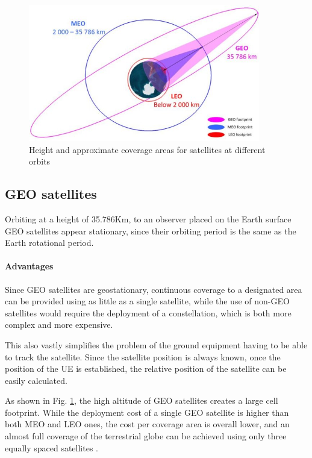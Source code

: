 \begin{figure}[ht]
    \centering
    \includegraphics[width=0.9\textwidth]{res/satellite-coverages.jpg}
    \caption{Height and approximate coverage areas for satellites at different orbits \cite{sustainable-sat-com-6g}}
    \label{fig:satellite_coverages}
\end{figure}

\subsection{GEO satellites}
Orbiting at a height of 35.786Km, to an observer placed on the Earth surface \ac{GEO} satellites appear stationary, since their orbiting period is the same as the Earth rotational period.

\paragraph{Advantages}    
Since \ac{GEO} satellites are geostationary, continuous coverage to a designated area can be provided using as little as a single satellite, while the use of non-\ac{GEO} satellites would require the deployment of a constellation, which is both more complex and more expensive. 

This also vastly simplifies the problem of the ground equipment having to be able to track the satellite. Since the satellite position is always known, once the position of the \ac{UE} is established, the relative position of the satellite can be easily calculated.

As shown in Fig. \ref{fig:satellite_coverages}, the high altitude of \ac{GEO} satellites creates a large cell footprint. While the deployment cost of a single \ac{GEO} satellite is higher than both \ac{MEO} and \ac{LEO} ones, the cost per coverage area is overall lower, and an almost full coverage of the terrestrial globe can be achieved using only three equally spaced satellites \cite{types-of-orbits-esa}.

